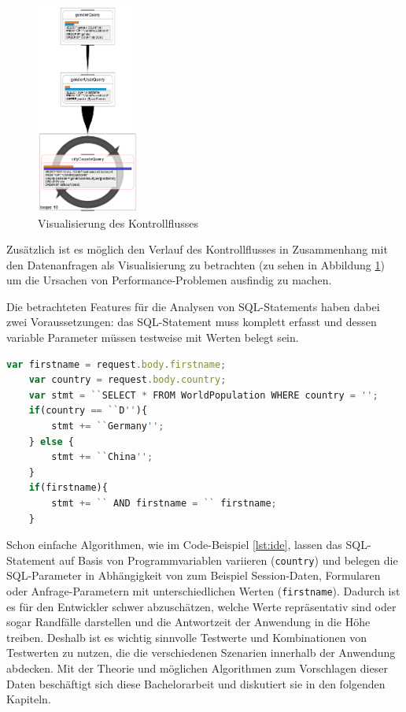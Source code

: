 \begin{figure}[ht]
	\centering
  \includegraphics[width=0.3\textwidth]{figures/feedback.png}
	\caption{Visualisierung des Kontrollflusses}
	\label{fig:feedback}
\end{figure}

Zusätzlich ist es möglich den Verlauf des Kontrollflusses in Zusammenhang mit den Datenanfragen als Visualisierung zu betrachten \cite{Frahnow2014} (zu sehen in Abbildung \ref{fig:feedback}) um die Ursachen von Performance-Problemen ausfindig zu machen.

Die betrachteten Features für die Analysen von SQL-Statements haben dabei zwei Voraussetzungen: das SQL-Statement muss komplett erfasst und dessen variable Parameter müssen testweise mit Werten belegt sein.

\begin{lstlisting}[caption={Variablen nehmen Einfluss auf die SQL-Query und -Parameter}, label={lst:ide}, language=JavaScript]
	var firstname = request.body.firstname;
	var country = request.body.country;
	var stmt = ``SELECT * FROM WorldPopulation WHERE country = '';
	if(country == ``D''){
		stmt += ``Germany'';
	} else {
		stmt += ``China'';
	}
	if(firstname){
		stmt += `` AND firstname = `` firstname;
	}
\end{lstlisting}

Schon einfache Algorithmen, wie im Code-Beispiel \ref{lst:ide}, lassen das SQL-Statement auf Basis von Programmvariablen variieren (\texttt{country}) und belegen die SQL-Parameter in Abhängigkeit von zum Beispiel Session-Daten, Formularen oder Anfrage-Parametern mit unterschiedlichen Werten (\texttt{firstname}).
Dadurch ist es für den Entwickler schwer abzuschätzen, welche Werte repräsentativ sind oder sogar Randfälle darstellen und die Antwortzeit der Anwendung in die Höhe treiben.
Deshalb ist es wichtig sinnvolle Testwerte und Kombinationen von Testwerten zu nutzen, die die verschiedenen Szenarien innerhalb der Anwendung abdecken.
Mit der Theorie und möglichen Algorithmen zum Vorschlagen dieser Daten beschäftigt sich diese Bachelorarbeit und diskutiert sie in den folgenden Kapiteln.
